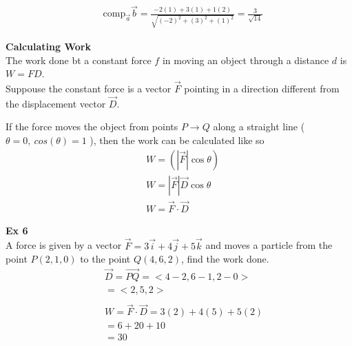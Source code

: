 \documentclass{article}
\begin{document}
\[
  \begin{aligned}
  &	\text{comp} _{ \vec{ a } }\vec{ b } = \frac{ -2(1) + 3(1) + 1(2)}{ \sqrt{ (-2) ^{2} + (3)^2 + (1)^2  }} = \boxed{ \frac{ 3 }{ \sqrt{ 14 }   } }
  \end{aligned}
\]

\textbf{Calculating Work}\\
The work done bt a constant force $ f $  in moving an object through a distance $ d $  is $ W=FD $.\\
Suppouse the constant force is a vector $ \vec{ F }  $ pointing in a direction different from the displacement vector $\vec{ D }$.

If the force moves the object from points $ P \to Q $ along a straight line ($ \theta = 0,~cos(\theta)=1 $ ), then the work can be calculated like so
\[
  \begin{aligned}
  & W= ( | \vec{ F }  | \cos{\theta})\\ 
  & W = | \vec{ F }  | \vec{ D } \cos{ \theta}\\
  & W = \vec{ F } \cdot \vec{ D }  
  \end{aligned}
\]

\textbf{Ex 6}\\
A force is given by a vector $ \vec{ F } = 3 \vec{ i } + 4 \vec{ j } + 5 \vec{ k } $ and moves a particle from the point $ P (2,1,0) $ to the point $ Q(4,6,2) $, find the work done.
\[
  \begin{aligned}
  &	\vec{ D } = \vec{ PQ } = < 4-2, 6-1, 2-0>\\
  & = < 2, 5, 2>\\
  ~\\
  & W = \vec{ F } \cdot \vec{ D } = 3(2) + 4(5) + 5(2) \\
  & = 6 + 20 + 10\\
  & = \boxed{30}
  \end{aligned}
\]

 
\end{document}
